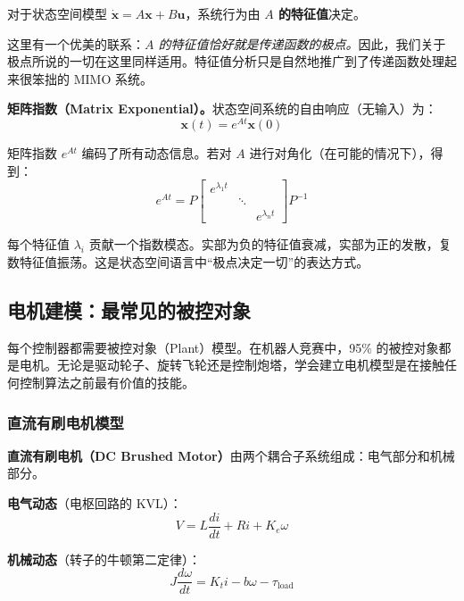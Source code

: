 对于状态空间模型 $\dot{\mathbf{x}} = A\mathbf{x} + B\mathbf{u}$，系统行为由 \textbf{$A$ 的特征值}决定。

这里有一个优美的联系：\textit{$A$ 的特征值恰好就是传递函数的极点。}因此，我们关于极点所说的一切在这里同样适用。特征值分析只是自然地推广到了传递函数处理起来很笨拙的 MIMO 系统。

\textbf{矩阵指数（Matrix Exponential）。}状态空间系统的自由响应（无输入）为：
\begin{equation}
\mathbf{x}(t) = e^{At}\mathbf{x}(0)
\end{equation}

矩阵指数 $e^{At}$ 编码了所有动态信息。若对 $A$ 进行对角化（在可能的情况下），得到：
\begin{equation}
e^{At} = P \begin{bmatrix} e^{\lambda_1 t} & & \\ & \ddots & \\ & & e^{\lambda_n t} \end{bmatrix} P^{-1}
\end{equation}

每个特征值 $\lambda_i$ 贡献一个指数模态。实部为负的特征值衰减，实部为正的发散，复数特征值振荡。这是状态空间语言中``极点决定一切''的表达方式。

\subsection{电机建模：最常见的被控对象}

每个控制器都需要被控对象（Plant）模型。在机器人竞赛中，95\% 的被控对象都是电机。无论是驱动轮子、旋转飞轮还是控制炮塔，学会建立电机模型是在接触任何控制算法之前最有价值的技能。

\subsubsection*{直流有刷电机模型}

\textbf{直流有刷电机（DC Brushed Motor）}由两个耦合子系统组成：电气部分和机械部分。

\textbf{电气动态}（电枢回路的 KVL）：
\begin{equation}
V = L\frac{di}{dt} + Ri + K_e\omega
\end{equation}

\textbf{机械动态}（转子的牛顿第二定律）：
\begin{equation}
J\frac{d\omega}{dt} = K_t i - b\omega - \tau_{\text{load}}
\end{equation}


